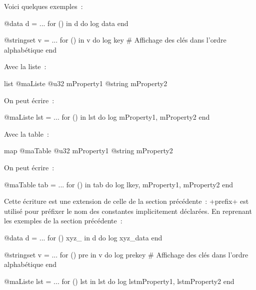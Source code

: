 Voici quelques exemples~:
\begin{galgas4}
@data d = ...
for () in d do
  log data
end
\end{galgas4}



\begin{galgas4}
@stringset v = ...
for () in v do
  log key # Affichage des clés dans l'ordre alphabétique
end
\end{galgas4}

Avec la liste~:
\begin{galgas4}
list @maListe {
  @u32 mProperty1
  @string mProperty2
}
\end{galgas4}

On peut écrire~:

\begin{galgas4}
@maListe lst = ...
for () in lst do
  log mProperty1, mProperty2
end
\end{galgas4}


Avec la table~:
\begin{galgas4}
map @maTable {
  @u32 mProperty1
  @string mProperty2
}
\end{galgas4}

On peut écrire~:

\begin{galgas4}
@maTable tab = ...
for () in tab do
  log lkey, mProperty1, mProperty2
end
\end{galgas4}



Cette écriture est une extension de celle de la section précédente~: \ggsq+prefix+ est utilisé pour préfixer le nom des constantes implicitement déclarées. En reprenant les exemples de la section précédente~:

\begin{galgas4}
@data d = ...
for () xyz_ in d do
  log xyz_data
end
\end{galgas4}



\begin{galgas4}
@stringset v = ...
for () pre in v do
  log prekey # Affichage des clés dans l'ordre alphabétique
end
\end{galgas4}


\begin{galgas4}
@maListe lst = ...
for () lst in lst do
  log lstmProperty1, lstmProperty2
end
\end{galgas4}


